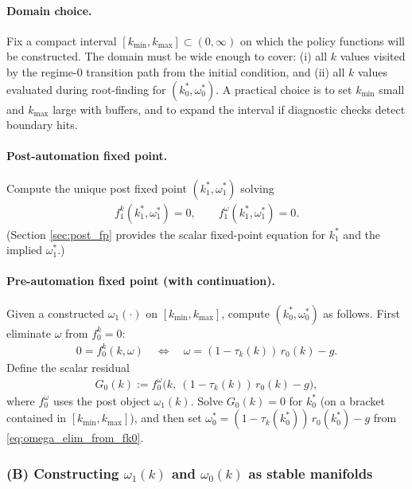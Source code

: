 \documentclass{article}
\begin{document}
\paragraph{Domain choice.}
Fix a compact interval $[k_{\min},k_{\max}]\subset(0,\infty)$ on which the policy
functions will be constructed. The domain must be wide enough to cover:
(i) all $k$ values visited by the regime-$0$ transition path from the initial condition,
and (ii) all $k$ values evaluated during root-finding for $(k_0^\ast,\omega_0^\ast)$.
A practical choice is to set $k_{\min}$ small and $k_{\max}$ large with buffers, and to
expand the interval if diagnostic checks detect boundary hits.

\paragraph{Post-automation fixed point.}
Compute the unique post fixed point $(k_1^\ast,\omega_1^\ast)$ solving
\begin{align}
f^k_1(k_1^\ast,\omega_1^\ast)=0,\qquad f^\omega_1(k_1^\ast,\omega_1^\ast)=0.
\end{align}
(Section \ref{sec:post_fp} provides the scalar fixed-point equation for $k_1^\ast$ and
the implied $\omega_1^\ast$.)

\paragraph{Pre-automation fixed point (with continuation).}
Given a constructed $\omega_1(\cdot)$ on $[k_{\min},k_{\max}]$, compute
$(k_0^\ast,\omega_0^\ast)$ as follows. First eliminate $\omega$ from $f^k_0=0$:
\begin{align}
0=f^k_0(k,\omega)
\quad\Longleftrightarrow\quad
\omega = (1-\tau_k(k))\,r_0(k)-g. \label{eq:omega_elim_from_fk0}
\end{align}
Define the scalar residual
\begin{align}
G_0(k) := f^\omega_0\!\Big(k,\ (1-\tau_k(k))\,r_0(k)-g\Big), \label{eq:G0_def}
\end{align}
where $f^\omega_0$ uses the post object $\omega_1(k)$. Solve $G_0(k)=0$ for $k_0^\ast$
(on a bracket contained in $[k_{\min},k_{\max}]$), and then set
$\omega_0^\ast=(1-\tau_k(k_0^\ast))\,r_0(k_0^\ast)-g$ from \eqref{eq:omega_elim_from_fk0}.

\subsubsection{(B) Constructing $\omega_1(k)$ and $\omega_0(k)$ as stable manifolds}\label{sec:numerics_manifold}
\end{document}
